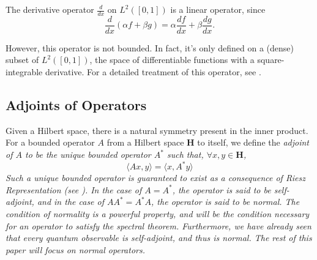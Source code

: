 \begin{example}
    The derivative operator $\frac{d}{dx}$ on $L^2([0,1])$ is a linear operator,
    since
    \[
        \frac{d}{dx}(\alpha f + \beta g) =
        \alpha\frac{df}{dx} + \beta\frac{dg}{dx}.
    \]

    However, this operator is not bounded. In fact, it's only defined on a
    (dense) subset of $L^2([0,1])$, the space of differentiable functions with a
    square-integrable derivative. For a detailed treatment of this operator, see
    \cite[p. 127-128, Ch. 9]{Hall2013}.
\end{example}

\subsection{Adjoints of Operators}
Given a Hilbert space, there is a natural symmetry present in the inner product.
For a bounded operator $A$ from a Hilbert space \textbf{H} to itself, we define
the \em adjoint of $A$ \em to be the unique bounded operator $A^*$ such that,
$\forall x,y \in \textbf{H}$,
\[
    \langle Ax,y\rangle = \langle x, A^*y\rangle
\]
Such a unique bounded operator is guaranteed to exist as a consequence of Riesz
Representation (see \cite[Thm. 2.12]{MacCluer2009}).
In the case of $A=A^*$, the operator is said to be \em self-adjoint\em, and in
the case of $AA^*=A^*A$, the operator is said to be \em normal\em. The condition
of normality is a powerful property, and will be the condition necessary for an
operator to satisfy the spectral theorem. Furthermore, we have already seen that
every quantum observable is self-adjoint, and thus is normal. The rest of this
paper will focus on normal operators.
